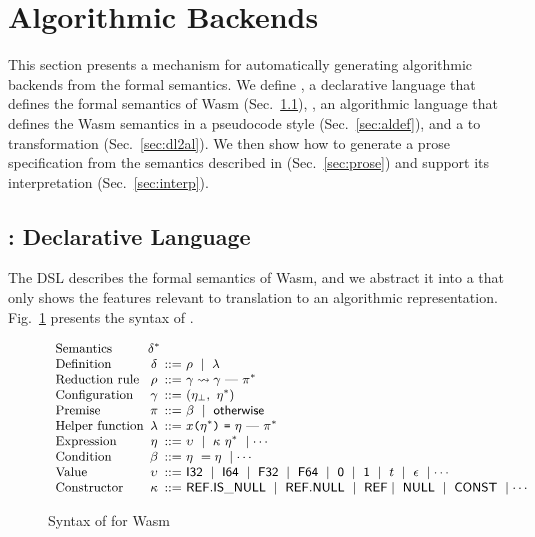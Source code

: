 \section{Algorithmic Backends}\label{sec:al} %
This section presents a mechanism for automatically generating
algorithmic backends from the formal semantics.
We define \emph{\dl}, a declarative language that defines the formal
semantics of Wasm (Sec.~\ref{sec:dl}),
\emph{\al}, an algorithmic language that defines the Wasm semantics
in a pseudocode style (Sec.~\ref{sec:aldef}),
and a \dl to \al transformation (Sec.~\ref{sec:dl2al}).
We then show how to generate a prose specification from the semantics
described in \al (Sec.~\ref{sec:prose}) and
support its interpretation (Sec.~\ref{sec:interp}).

\subsection{\dl: Declarative Language}\label{sec:dl} %
The DSL describes the formal semantics of Wasm, and
we abstract it into a \dl that only shows the features relevant to translation to an algorithmic representation.
Fig.~\ref{fig:dl-syntax} presents the syntax of \dl.

\begin{figure}[t]
\[
\small
\begin{array}{l@{~}c@{~}r@{~}l}
\text{Semantics} & \delta^*\\
\text{Definition} & \delta &::=& \rho\ \mid\ \lambda\\
\text{Reduction rule} & \rho &::=& \gamma \leadsto \gamma\ \mbox{---}\ \pi^*\\
\text{Configuration} & \gamma &::=&(\eta_\bot,\ \eta^*)\\
\text{Premise} & \pi &::=& \beta\ \mid\ \mathsf{\small otherwise}\\
\text{Helper function} &
\lambda &::=& \varx \kwrl \eta^* \kwrr\ \kwequ\ \eta\ \mbox{---}\ \pi^*\\
\text{Expression} & \eta &::=& \upsilon\ \mid\ \kappa\ \eta^*\ \mid \cdots \\
\text{Condition} & \beta  &::=& \eta\ = \eta\ \mid \cdots\\
\text{Value} & \upsilon &::=& \ssf{I32}\ \mid\ \ssf{I64}\ \mid\ 
\ssf{F32}\ \mid\ \ssf{F64}\ \mid\ 
\ssf{0}\ \mid\ \ssf{1}\ \mid\ t\ \mid\ \epsilon\ \mid \cdots \\
\text{Constructor} & \kappa &::=& \ssf{REF.IS\_NULL}\ \mid\ \ssf{REF.NULL}\
\mid\ \ssf{REF} \mid\ \ssf{NULL}\ \mid\ \ssf{CONST}\ \mid \cdots
\end{array}
\]
\caption{Syntax of \dl for Wasm}\label{fig:dl-syntax}
\end{figure}

